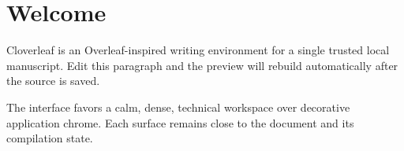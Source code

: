 \section{Welcome}

Cloverleaf is an Overleaf-inspired writing environment for a single trusted local manuscript. Edit this paragraph and the preview will rebuild automatically after the source is saved.

The interface favors a calm, dense, technical workspace over decorative application chrome. Each surface remains close to the document and its compilation state.
